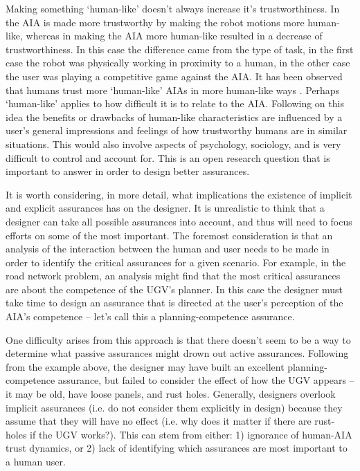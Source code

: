    Making something `human-like' doesn't always increase it's trustworthiness. In \cite{Dragan2013-wd} the AIA is made more trustworthy by making the robot motions more human-like, whereas in \cite{Wu2016-ei} making the AIA more human-like resulted in a decrease of trustworthiness. In this case the difference came from the type of task, in the first case the robot was physically working in proximity to a human, in the other case the user was playing a competitive game against the AIA. It has been observed that humans trust more `human-like' AIAs in more human-like ways \citet{Tripp2011-rx}. Perhaps `human-like' applies to how difficult it is to relate to the AIA. Following on this idea the benefits or drawbacks of human-like characteristics are influenced by a user's general impressions and feelings of how trustworthy humans are in similar situations. This would also involve aspects of psychology, sociology, and is very difficult to control and account for. This is an open research question that is important to answer in order to design better assurances.

    It is worth considering, in more detail, what implications the existence of implicit and explicit assurances has on the designer. It is unrealistic to think that a designer can take all possible assurances into account, and thus will need to focus efforts on some of the most important. The foremost consideration is that an analysis of the interaction between the human and user needs to be made in order to identify the critical assurances for a given scenario. For example, in the road network problem, an analysis might find that the most critical assurances are about the competence of the UGV's planner. In this case the designer must take time to design an assurance that is directed at the user's perception of the AIA's competence -- let's call this a planning-competence assurance.

    One difficulty arises from this approach is that there doesn't seem to be a way to determine what passive assurances might drown out active assurances. Following from the example above, the designer may have built an excellent planning-competence assurance, but failed to consider the effect of how the UGV appears -- it may be old, have loose panels, and rust holes. Generally, designers overlook implicit assurances (i.e. do not consider them explicitly in design) because they assume that they will have no effect (i.e. why does it matter if there are rust-holes if the UGV works?). This can stem from either: 1) ignorance of human-AIA trust dynamics, or 2) lack of identifying which assurances are most important to a human user.

